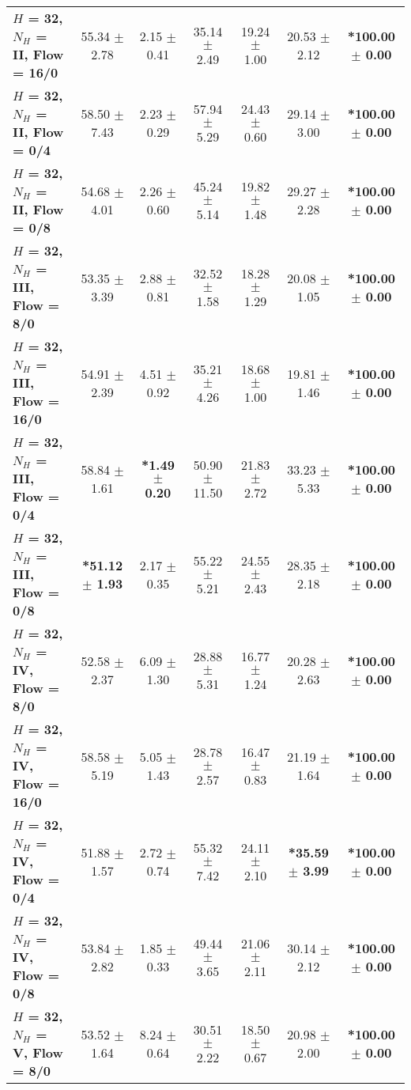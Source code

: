 \begin{table*}[ht]
{\begin{tabular}{lcccccc}
        \textbf{$H$ = 32, $N_H$ = II, Flow = 16/0} & 55.34 $\pm$ 2.78 & 2.15 $\pm$ 0.41 & 35.14 $\pm$ 2.49 & 19.24 $\pm$ 1.00 & 20.53 $\pm$ 2.12 & \textbf{*100.00 $\pm$ 0.00} \\
        \textbf{$H$ = 32, $N_H$ = II, Flow = 0/4} & 58.50 $\pm$ 7.43 & 2.23 $\pm$ 0.29 & 57.94 $\pm$ 5.29 & 24.43 $\pm$ 0.60 & 29.14 $\pm$ 3.00 & \textbf{*100.00 $\pm$ 0.00} \\
        \textbf{$H$ = 32, $N_H$ = II, Flow = 0/8} & 54.68 $\pm$ 4.01 & 2.26 $\pm$ 0.60 & 45.24 $\pm$ 5.14 & 19.82 $\pm$ 1.48 & 29.27 $\pm$ 2.28 & \textbf{*100.00 $\pm$ 0.00} \\
        \midrule
        \textbf{$H$ = 32, $N_H$ = III, Flow = 8/0} & 53.35 $\pm$ 3.39 & 2.88 $\pm$ 0.81 & 32.52 $\pm$ 1.58 & 18.28 $\pm$ 1.29 & 20.08 $\pm$ 1.05 & \textbf{*100.00 $\pm$ 0.00} \\
        \textbf{$H$ = 32, $N_H$ = III, Flow = 16/0} & 54.91 $\pm$ 2.39 & 4.51 $\pm$ 0.92 & 35.21 $\pm$ 4.26 & 18.68 $\pm$ 1.00 & 19.81 $\pm$ 1.46 & \textbf{*100.00 $\pm$ 0.00} \\
        \textbf{$H$ = 32, $N_H$ = III, Flow = 0/4} & 58.84 $\pm$ 1.61 & \textbf{*1.49 $\pm$ 0.20} & 50.90 $\pm$ 11.50 & 21.83 $\pm$ 2.72 & 33.23 $\pm$ 5.33 & \textbf{*100.00 $\pm$ 0.00} \\
        \textbf{$H$ = 32, $N_H$ = III, Flow = 0/8} & \textbf{*51.12 $\pm$ 1.93} & 2.17 $\pm$ 0.35 & 55.22 $\pm$ 5.21 & 24.55 $\pm$ 2.43 & 28.35 $\pm$ 2.18 & \textbf{*100.00 $\pm$ 0.00} \\
        \midrule
        \textbf{$H$ = 32, $N_H$ = IV, Flow = 8/0} & 52.58 $\pm$ 2.37 & 6.09 $\pm$ 1.30 & 28.88 $\pm$ 5.31 & 16.77 $\pm$ 1.24 & 20.28 $\pm$ 2.63 & \textbf{*100.00 $\pm$ 0.00} \\
        \textbf{$H$ = 32, $N_H$ = IV, Flow = 16/0} & 58.58 $\pm$ 5.19 & 5.05 $\pm$ 1.43 & 28.78 $\pm$ 2.57 & 16.47 $\pm$ 0.83 & 21.19 $\pm$ 1.64 & \textbf{*100.00 $\pm$ 0.00} \\
        \textbf{$H$ = 32, $N_H$ = IV, Flow = 0/4} & 51.88 $\pm$ 1.57 & 2.72 $\pm$ 0.74 & 55.32 $\pm$ 7.42 & 24.11 $\pm$ 2.10 & \textbf{*35.59 $\pm$ 3.99} & \textbf{*100.00 $\pm$ 0.00} \\
        \textbf{$H$ = 32, $N_H$ = IV, Flow = 0/8} & 53.84 $\pm$ 2.82 & 1.85 $\pm$ 0.33 & 49.44 $\pm$ 3.65 & 21.06 $\pm$ 2.11 & 30.14 $\pm$ 2.12 & \textbf{*100.00 $\pm$ 0.00} \\
        \midrule
        \textbf{$H$ = 32, $N_H$ = V, Flow = 8/0} & 53.52 $\pm$ 1.64 & 8.24 $\pm$ 0.64 & 30.51 $\pm$ 2.22 & 18.50 $\pm$ 0.67 & 20.98 $\pm$ 2.00 & \textbf{*100.00 $\pm$ 0.00} \\

\end{tabular}}
\end{table*}
